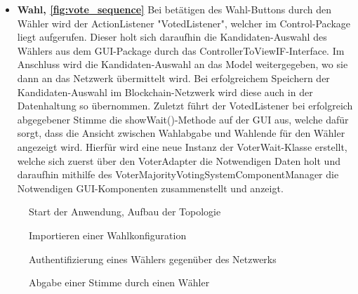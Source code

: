 \documentclass[parskip=full]{scrartcl}
\newcommand{\fakeparagraph}[1]{\textbf{#1}}
\begin{document}
\begin{itemize}
	\item\fakeparagraph{Wahl, \autoref{fig:vote_sequence} } Bei betätigen des Wahl-Buttons durch den Wähler wird der ActionListener "VotedListener", welcher im Control-Package liegt aufgerufen. Dieser holt sich daraufhin die Kandidaten-Auswahl des Wählers aus dem GUI-Package durch das ControllerToViewIF-Interface. Im Anschluss wird die Kandidaten-Auswahl an das Model weitergegeben, wo sie dann an das Netzwerk übermittelt wird. Bei erfolgreichem Speichern der Kandidaten-Auswahl im Blockchain-Netzwerk wird diese auch in der Datenhaltung so übernommen. Zuletzt führt der VotedListener bei erfolgreich abgegebener Stimme die showWait()-Methode auf der GUI aus, welche dafür sorgt, dass die Ansicht zwischen Wahlabgabe und Wahlende für den Wähler angezeigt wird. Hierfür wird eine neue Instanz der VoterWait-Klasse erstellt, welche sich zuerst über den VoterAdapter die Notwendigen Daten holt und daraufhin mithilfe des VoterMajorityVotingSystemComponentManager die Notwendigen GUI-Komponenten zusammenstellt und anzeigt.
	
	\end{itemize}
	\newpage
	\pagestyle{empty}
		\begin{figure}
		\centering
		\hspace{-100pt}
		\centerline{}
		\caption{Start der Anwendung, Aufbau der Topologie}
		\label{fig:main_thread}
	\end{figure}

	\newpage
	\begin{figure}
		\centering
		\hspace{-100pt}
		\centerline{}
		\caption{Importieren einer Wahlkonfiguration}
		\label{fig:config_import}
	\end{figure}

	\newpage
	\begin{figure}
		\centering
		\hspace{-100pt}
		\centerline{}
		\caption{Authentifizierung eines Wählers gegenüber des Netzwerks}
		\label{fig:voter_auth}
	\end{figure}

	\newpage
	\begin{figure}
		\centering
		\hspace{-100pt}
		\centerline{}
		\caption{Abgabe einer Stimme durch einen Wähler}
		\label{fig:vote_sequence}
	\end{figure}
\end{document}
